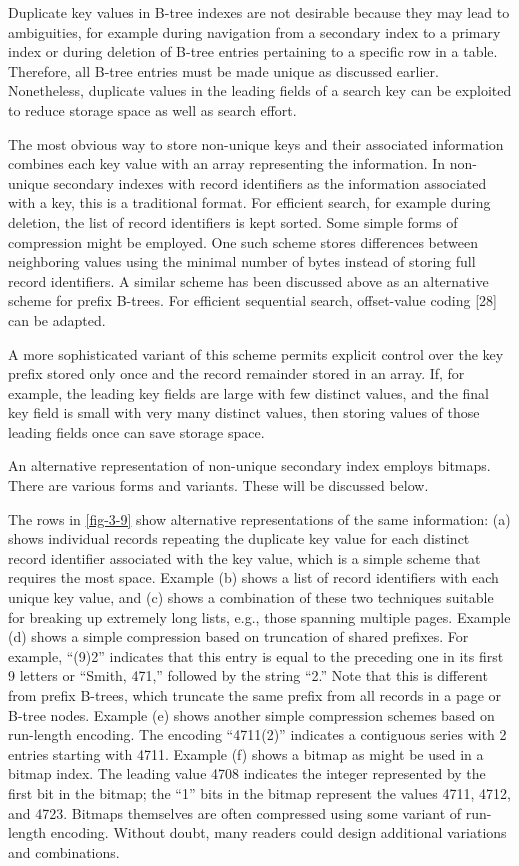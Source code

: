 Duplicate key values in B-tree indexes are not desirable because they
may lead to ambiguities, for example during navigation from a secondary
index to a primary index or during deletion of B-tree entries pertaining
to a specific row in a table. Therefore, all B-tree entries must be made
unique as discussed earlier. Nonetheless, duplicate values in the
leading fields of a search key can be exploited to reduce storage space
as well as search effort.

The most obvious way to store non-unique keys and their associated
information combines each key value with an array representing the
information. In non-unique secondary indexes with record identifiers as
the information associated with a key, this is a traditional format. For
efficient search, for example during deletion, the list of record
identifiers is kept sorted. Some simple forms of compression might be
employed. One such scheme stores differences between neighboring values
using the minimal number of bytes instead of storing full record
identifiers. A similar scheme has been discussed above as an alternative
scheme for prefix B-trees. For efficient sequential search, offset-value
coding {[}28{]} can be adapted.

A more sophisticated variant of this scheme permits explicit control
over the key prefix stored only once and the record remainder stored in
an array. If, for example, the leading key fields are large with few
distinct values, and the final key field is small with very many
distinct values, then storing values of those leading fields once can
save storage space.

An alternative representation of non-unique secondary index employs
bitmaps. There are various forms and variants. These will be discussed
below.

The rows in \autoref{fig-3-9} show alternative representations of the same
information: (a) shows individual records repeating the duplicate key
value for each distinct record identifier associated with the key value,
which is a simple scheme that requires the most space. Example (b) shows
a list of record identifiers with each unique key value, and (c) shows a
combination of these two techniques suitable for breaking up extremely
long lists, e.g., those spanning multiple pages. Example (d) shows a
simple compression based on truncation of shared prefixes. For example,
``(9)2'' indicates that this entry is equal to the preceding one in its
first 9 letters or ``Smith, 471,'' followed by the string ``2.'' Note
that this is different from prefix B-trees, which truncate the same
prefix from all records in a page or B-tree nodes. Example (e) shows
another simple compression schemes based on run-length encoding. The
encoding ``4711(2)'' indicates a contiguous series with 2 entries
starting with 4711. Example (f) shows a bitmap as might be used in a
bitmap index. The leading value 4708 indicates the integer represented
by the first bit in the bitmap; the ``1'' bits in the bitmap represent
the values 4711, 4712, and 4723. Bitmaps themselves are often compressed
using some variant of run-length encoding. Without doubt, many readers
could design additional variations and combinations.

